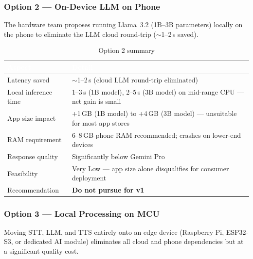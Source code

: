 \documentclass[12pt,a4paper]{article}
\begin{document}
\subsubsection{Option 2 — On-Device LLM on Phone}

The hardware team proposes running Llama~3.2 (1B--3B parameters) locally on the phone to
eliminate the LLM cloud round-trip ($\sim$1--2\,s saved).

\begin{table}[h!]
\centering
\renewcommand{\arraystretch}{1.3}
\begin{tabularx}{\linewidth}{|l|X|}
\hline
\rowcolor{primary}
\textcolor{white}{\textbf{Aspect}} & \textcolor{white}{\textbf{Detail}} \\
\hline
Latency saved        & $\sim$1--2\,s (cloud LLM round-trip eliminated) \\
\hline
\rowcolor{rowalt}
Local inference time & 1--3\,s (1B model), 2--5\,s (3B model) on mid-range CPU — net gain is small \\
\hline
App size impact      & +1\,GB (1B model) to +4\,GB (3B model) — unsuitable for most app stores \\
\hline
\rowcolor{rowalt}
RAM requirement      & 6--8\,GB phone RAM recommended; crashes on lower-end devices \\
\hline
Response quality     & Significantly below Gemini Pro \\
\hline
\rowcolor{rowalt}
Feasibility          & Very Low — app size alone disqualifies for consumer deployment \\
\hline
Recommendation       & \textbf{Do not pursue for v1} \\
\hline
\end{tabularx}
\caption{Option 2 summary}
\end{table}

\subsubsection{Option 3 — Local Processing on MCU}

Moving STT, LLM, and TTS entirely onto an edge device (Raspberry Pi, ESP32-S3, or dedicated AI
module) eliminates all cloud and phone dependencies but at a significant quality cost.
\end{document}
